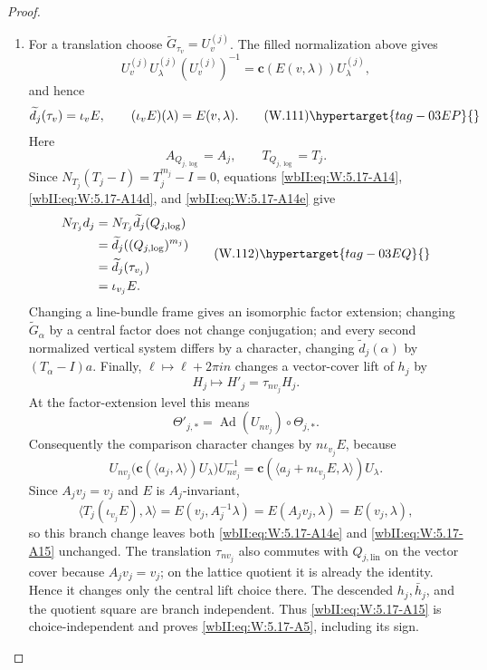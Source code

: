 \begin{proof}
\begin{enumerate}[label={$\langle1\rangle$\arabic*.},leftmargin=*]
\item For a translation choose
\(\widetilde G_{\tau_v}=U_v^{(j)}\).  The filled normalization above gives
\[
 U_v^{(j)}U_\lambda^{(j)}(U_v^{(j)})^{-1}
 =\mathbf c(E(v,\lambda))U_\lambda^{(j)},
\]
and hence
\[
 \widetilde d_j(\tau_v)=\iota_vE,\qquad
 (\iota_vE)(\lambda)=E(v,\lambda).
\tag{W.111}\hypertarget{tag-03EP}{}\label{wbII:eq:W:5.17-A14f}
\]
Here
\[
 A_{Q_{j,\log}}=A_j,\qquad T_{Q_{j,\log}}=T_j.
\]
Since \(N_{T_j}(T_j-I)=T_j^{m_j}-I=0\), equations
\eqref{wbII:eq:W:5.17-A14}, \eqref{wbII:eq:W:5.17-A14d}, and \eqref{wbII:eq:W:5.17-A14e} give
\[
\begin{aligned}
 N_{T_j}d_j
 &=N_{T_j}\widetilde d_j(Q_{j,\log})\\
 &=\widetilde d_j((Q_{j,\log})^{m_j})\\
 &=\widetilde d_j(\tau_{v_j})\\
 &=\iota_{v_j}E.
\end{aligned}
\tag{W.112}\hypertarget{tag-03EQ}{}\label{wbII:eq:W:5.17-A15}
\]
Changing a line-bundle frame gives an isomorphic factor extension; changing
\(\widetilde G_\alpha\) by a central factor does not change conjugation; and
every second normalized vertical system differs by a character, changing
\(\widetilde d_j(\alpha)\) by \((T_\alpha-I)a\).  Finally,
\(\ell\mapsto\ell+2\pi in\) changes a vector-cover lift of \(h_j\) by
\[
 H_j\longmapsto H'_j=\tau_{nv_j}H_j.
\]
At the factor-extension level this means
\[
 \Theta'_{j,*}
 =\operatorname{Ad}(U_{nv_j})\circ\Theta_{j,*}.
\]
Consequently the comparison character changes by
\(n\iota_{v_j}E\), because
\[
 U_{nv_j}
 \bigl(\mathbf c(\langle a_j,\lambda\rangle)U_\lambda\bigr)
 U_{nv_j}^{-1}
 =
 \mathbf c(\langle a_j+n\iota_{v_j}E,\lambda\rangle)U_\lambda.
\]
Since \(A_jv_j=v_j\) and \(E\) is \(A_j\)-invariant,
\[
 \langle T_j(\iota_{v_j}E),\lambda\rangle
 =E(v_j,A_j^{-1}\lambda)
 =E(A_jv_j,\lambda)
 =E(v_j,\lambda),
\]
so this branch change leaves both \eqref{wbII:eq:W:5.17-A14e} and \eqref{wbII:eq:W:5.17-A15} unchanged.
The translation \(\tau_{nv_j}\) also commutes with
\(Q_{j,\mathrm{lin}}\) on the vector cover because \(A_jv_j=v_j\); on the
lattice quotient it is already the identity.  Hence it changes only the
central lift choice there.
The descended \(h_j,\bar h_j\), and the quotient square are branch
independent.  Thus \eqref{wbII:eq:W:5.17-A15} is choice-independent and proves \eqref{wbII:eq:W:5.17-A5},
including its sign.


\end{enumerate}
\end{proof}
